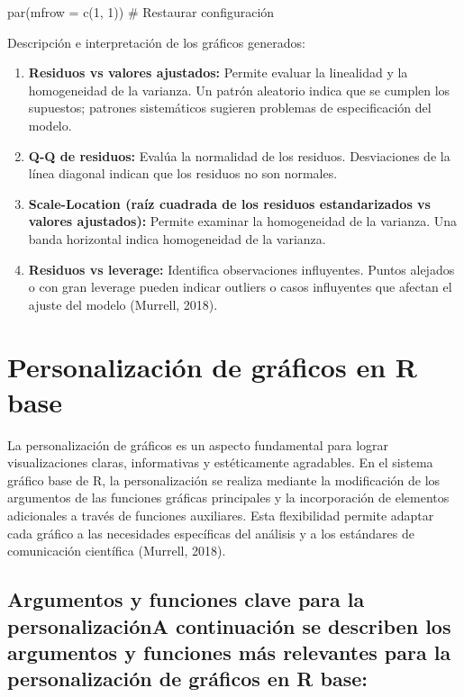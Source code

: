 \documentclass[
  spanish,
  a4paper,
  DIV=11,
  numbers=noendperiod,
  onepage,
  openany]{scrreprt}
\newenvironment{Shaded}{\begin{snugshade}}{\end{snugshade}}
\newcommand{\AttributeTok}[1]{\textcolor[rgb]{0.40,0.45,0.13}{#1}}
\newcommand{\CommentTok}[1]{\textcolor[rgb]{0.37,0.37,0.37}{#1}}
\newcommand{\DecValTok}[1]{\textcolor[rgb]{0.68,0.00,0.00}{#1}}
\newcommand{\FunctionTok}[1]{\textcolor[rgb]{0.28,0.35,0.67}{#1}}
\newcommand{\NormalTok}[1]{\textcolor[rgb]{0.00,0.23,0.31}{#1}}
\begin{document}
\begin{Shaded}
\begin{Highlighting}[]
\FunctionTok{par}\NormalTok{(}\AttributeTok{mfrow =} \FunctionTok{c}\NormalTok{(}\DecValTok{1}\NormalTok{, }\DecValTok{1}\NormalTok{))                       }\CommentTok{\# Restaurar configuración}
\end{Highlighting}
\end{Shaded}

Descripción e interpretación de los gráficos generados:

\begin{enumerate}
\def\labelenumi{\arabic{enumi}.}
\item
  \textbf{Residuos vs valores ajustados:} Permite evaluar la linealidad
  y la homogeneidad de la varianza. Un patrón aleatorio indica que se
  cumplen los supuestos; patrones sistemáticos sugieren problemas de
  especificación del modelo.
\item
  \textbf{Q-Q de residuos:} Evalúa la normalidad de los residuos.
  Desviaciones de la línea diagonal indican que los residuos no son
  normales.
\item
  \textbf{Scale-Location (raíz cuadrada de los residuos estandarizados
  vs valores ajustados):} Permite examinar la homogeneidad de la
  varianza. Una banda horizontal indica homogeneidad de la varianza.
\item
  \textbf{Residuos vs leverage:} Identifica observaciones influyentes.
  Puntos alejados o con gran leverage pueden indicar outliers o casos
  influyentes que afectan el ajuste del modelo (Murrell, 2018).
\end{enumerate}

\section{Personalización de gráficos en R
base}\label{personalizaciuxf3n-de-gruxe1ficos-en-r-base}

La personalización de gráficos es un aspecto fundamental para lograr
visualizaciones claras, informativas y estéticamente agradables. En el
sistema gráfico base de R, la personalización se realiza mediante la
modificación de los argumentos de las funciones gráficas principales y
la incorporación de elementos adicionales a través de funciones
auxiliares. Esta flexibilidad permite adaptar cada gráfico a las
necesidades específicas del análisis y a los estándares de comunicación
científica (Murrell, 2018).

\subsection{\texorpdfstring{\textbf{Argumentos y funciones clave para la
personalizaciónA continuación se describen los argumentos y funciones
más relevantes para la personalización de gráficos en R
base:}}{Argumentos y funciones clave para la personalizaciónA continuación se describen los argumentos y funciones más relevantes para la personalización de gráficos en R base:}}\label{argumentos-y-funciones-clave-para-la-personalizaciuxf3na-continuaciuxf3n-se-describen-los-argumentos-y-funciones-muxe1s-relevantes-para-la-personalizaciuxf3n-de-gruxe1ficos-en-r-base}
\end{document}
